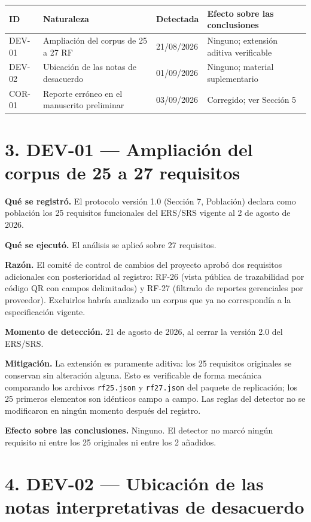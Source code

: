 \documentclass[11pt,a4paper]{article}
\begin{document}
\begin{longtable}{p{1.6cm}p{5.2cm}p{2.2cm}p{5.6cm}}
\toprule
\textbf{ID} & \textbf{Naturaleza} & \textbf{Detectada} & \textbf{Efecto sobre las
conclusiones} \\
\midrule
\endhead
DEV-01 & Ampliación del corpus de 25 a 27 RF & 21/08/2026 & Ninguno; extensión
aditiva verificable \\
DEV-02 & Ubicación de las notas de desacuerdo & 01/09/2026 & Ninguno; material
suplementario \\
COR-01 & Reporte erróneo en el manuscrito preliminar & 03/09/2026 & Corregido;
ver Sección 5 \\
\bottomrule
\end{longtable}

\section*{3. DEV-01 --- Ampliación del corpus de 25 a 27 requisitos}

\textbf{Qué se registró.} El protocolo versión 1.0 (Sección 7, Población)
declara como población los 25 requisitos funcionales del ERS/SRS vigente al
2 de agosto de 2026.

\textbf{Qué se ejecutó.} El análisis se aplicó sobre 27 requisitos.

\textbf{Razón.} El comité de control de cambios del proyecto aprobó dos
requisitos adicionales con posterioridad al registro: RF-26 (vista pública de
trazabilidad por código QR con campos delimitados) y RF-27 (filtrado de
reportes gerenciales por proveedor). Excluirlos habría analizado un corpus que
ya no correspondía a la especificación vigente.

\textbf{Momento de detección.} 21 de agosto de 2026, al cerrar la versión 2.0
del ERS/SRS.

\textbf{Mitigación.} La extensión es puramente aditiva: los 25 requisitos
originales se conservan sin alteración alguna. Esto es verificable de forma
mecánica comparando los archivos \texttt{rf25.json} y \texttt{rf27.json} del
paquete de replicación; los 25 primeros elementos son idénticos campo a campo.
Las reglas del detector no se modificaron en ningún momento después del
registro.

\textbf{Efecto sobre las conclusiones.} Ninguno. El detector no marcó ningún
requisito ni entre los 25 originales ni entre los 2 añadidos.

\section*{4. DEV-02 --- Ubicación de las notas interpretativas de desacuerdo}
\end{document}
